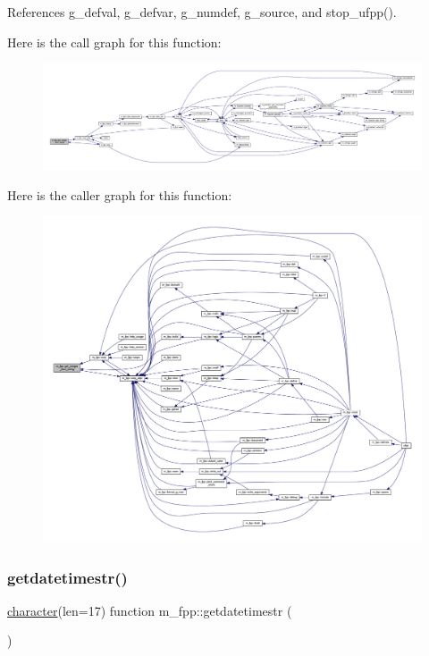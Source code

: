 References g\+\_\+defval, g\+\_\+defvar, g\+\_\+numdef, g\+\_\+source, and stop\+\_\+ufpp().

Here is the call graph for this function\+:
\nopagebreak
\begin{figure}[H]
\begin{center}
\leavevmode
\includegraphics[width=350pt]{namespacem__fpp_a3293bb9a959675261bda2b8f6fe3fa9e_cgraph}
\end{center}
\end{figure}
Here is the caller graph for this function\+:
\nopagebreak
\begin{figure}[H]
\begin{center}
\leavevmode
\includegraphics[width=350pt]{namespacem__fpp_a3293bb9a959675261bda2b8f6fe3fa9e_icgraph}
\end{center}
\end{figure}
\mbox{\label{namespacem__fpp_aa52b30ff734a7831d3334aee5ef4e8e7}} 
\subsubsection{\texorpdfstring{getdatetimestr()}{getdatetimestr()}}
{\footnotesize\ttfamily \hyperlink{option__stopwatch_83_8txt_abd4b21fbbd175834027b5224bfe97e66}{character}(len=17) function m\+\_\+fpp\+::getdatetimestr (\begin{DoxyParamCaption}{ }\end{DoxyParamCaption})}

